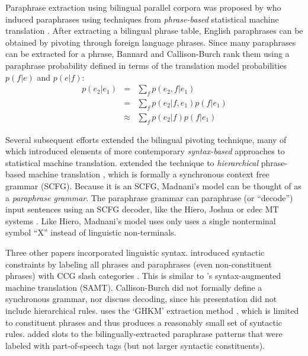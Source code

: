 \documentclass[11pt]{article}
\begin{document}
Paraphrase extraction using bilingual parallel corpora was proposed by 
who induced paraphrases using techniques from {\it phrase-based}
statistical machine translation \cite{Koehn2003}. After extracting a
bilingual phrase table, English paraphrases can be obtained by
pivoting through foreign language phrases. 
Since many
paraphrases can be extracted for a phrase, Bannard and Callison-Burch rank them using a paraphrase probability defined in terms of the translation model
probabilities $p(f | e)$ and $p(e | f)$: 
\nocite{Callison-Burch2005}
\begin{eqnarray}
  p(e_2|e_1) &=& \sum_f p(e_2,f|e_1)\\
                  &=& \sum_f p(e_2|f,e_1) p(f|e_1) \\
                  &\approx& \sum_f p(e_2|f) p(f|e_1)
\label{paraphrase_prob_eqn}
\end{eqnarray}

Several subsequent efforts extended the bilingual pivoting technique, many of which introduced 
elements of more contemporary {\it syntax-based} approaches to statistical machine translation.   
 extended the technique to {\it hierarchical}
phrase-based machine translation \cite{Chiang2005}, which is formally a synchronous context free grammar (SCFG).  Because it is an SCFG,  Madnani's model can be thought of as a {\it  paraphrase grammar}. The paraphrase grammar can paraphrase (or ``decode'') input sentences using an SCFG decoder, like the Hiero, Joshua or cdec MT systems \cite{Chiang2007,Joshua-WMT,Dyer_etal_2010}.
Like Hiero, Madnani's model uses only uses a single nonterminal symbol ``X'' instead of linguistic non-terminals.


Three other papers incorporated linguistic syntax. 
 introduced syntactic constraints by labeling all phrases and paraphrases (even non-constituent phrases) with CCG slash categories \cite{Steedman1999}. This is similar  to 's syntax-augmented machine translation (SAMT). Callison-Burch did not formally define a synchronous grammar, nor discuss decoding, since his presentation did not include hierarchical rules.
 uses the `GHKM' extraction method \cite{Galley2004}, which is limited to constituent phrases and thus produces a reasonably small set of syntactic rules.
 added slots to the bilingually-extracted 
paraphrase patterns that were labeled with part-of-speech tags (but not
larger syntactic constituents). 
\end{document}
